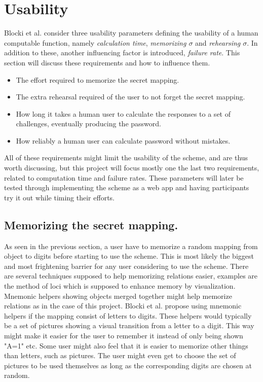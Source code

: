 \section{Usability}\label{sec:usability}
Blocki et al. \cite{hcp-blocki} consider three usability parameters defining the usability of a human computable function, namely \emph{calculation time}, \emph{memorizing $\sigma$} and \emph{rehearsing $\sigma$}. In addition to these, another influencing factor is introduced, \emph{failure rate}. This section will discuss these requirements and how to influence them.
\begin{itemize}
    \item The effort required to memorize the secret mapping.
    \item The extra rehearsal required of the user to not forget the secret mapping. 
    \item How long it takes a human user to calculate the responses to a set of challenges, eventually producing the password. 
    \item How reliably a human user can calculate password without mistakes.
\end{itemize}
All of these requirements might limit the usability of the scheme, and are thus worth discussing, but this project will focus mostly one the last two requirements, related to computation time and failure rates. These parameters will later be tested through implementing the scheme as a web app and having participants try it out while timing their efforts. 

\subsection{Memorizing the secret mapping.}
As seen in the previous section, a user have to memorize a random mapping from object to digits before starting to use the scheme. This is most likely the biggest and most frightening barrier for any user considering to use the scheme. There are several techniques supposed to help memorizing relations easier, examples are the method of loci \cite{human-memory} which is supposed to enhance memory by visualization. Mnemonic helpers showing objects merged together might help memorize relations as in the case of this project. Blocki et al. \cite{hcp-blocki} propose using mnemonic helpers if the mapping consist of letters to digits. These helpers would typically be a set of pictures showing a visual transition from a letter to a digit. This way might make it easier for the user to remember it instead of only being shown "A=1" etc. Some user might also feel that it is easier to memorize other things than letters, such as pictures. The user might even get to choose the set of pictures to be used themselves as long as the corresponding digits are chosen at random. 

